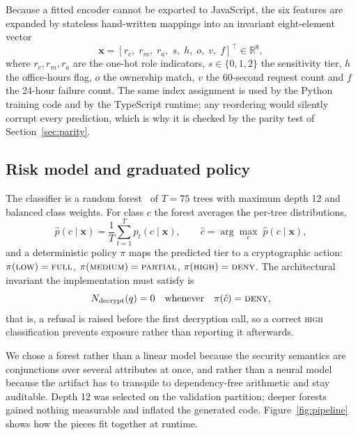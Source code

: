 \documentclass[a4paper,conference]{IEEEtran}
\newcommand{\HIGH}{\textsc{high}}
\newcommand{\MED}{\textsc{medium}}
\newcommand{\LOW}{\textsc{low}}
\begin{document}
Because a fitted encoder cannot be exported to JavaScript, the six features are expanded by
stateless hand-written mappings into an invariant eight-element vector
\begin{equation}
\mathbf{x}=[r_c,\; r_m,\; r_a,\; s,\; h,\; o,\; v,\; f]^{\top}\in\mathbb{R}^{8},
\end{equation}
where $r_c,r_m,r_a$ are the one-hot role indicators, $s\in\{0,1,2\}$ the sensitivity tier,
$h$ the office-hours flag, $o$ the ownership match, $v$ the 60-second request count and $f$ the
24-hour failure count. The same index assignment is used by the Python training code and by the
TypeScript runtime; any reordering would silently corrupt every prediction, which is why it is
checked by the parity test of Section~\ref{sec:parity}.

\subsection{Risk model and graduated policy}

The classifier is a random forest~\cite{rf} of $T=75$ trees with maximum depth 12 and balanced
class weights. For class $c$ the forest averages the per-tree distributions,
\begin{equation}
\hat p(c\mid\mathbf{x})=\frac{1}{T}\sum_{t=1}^{T}p_t(c\mid\mathbf{x}),
\qquad
\hat c=\arg\max_{c}\;\hat p(c\mid\mathbf{x}),
\end{equation}
and a deterministic policy $\pi$ maps the predicted tier to a cryptographic action:
$\pi(\LOW)=\textsc{full}$, $\pi(\MED)=\textsc{partial}$, $\pi(\HIGH)=\textsc{deny}$. The
architectural invariant the implementation must satisfy is
\begin{equation}
N_{\text{decrypt}}(q)=0 \quad\text{whenever}\quad \pi(\hat c)=\textsc{deny},
\label{eq:invariant}
\end{equation}
that is, a refusal is raised before the first decryption call, so a correct \HIGH{}
classification prevents exposure rather than reporting it afterwards.

We chose a forest rather than a linear model because the security semantics are conjunctions
over several attributes at once, and rather than a neural model because the artifact has to
transpile to dependency-free arithmetic and stay auditable. Depth 12 was selected on the
validation partition; deeper forests gained nothing measurable and inflated the generated code.
Figure~\ref{fig:pipeline} shows how the pieces fit together at runtime.
\end{document}

